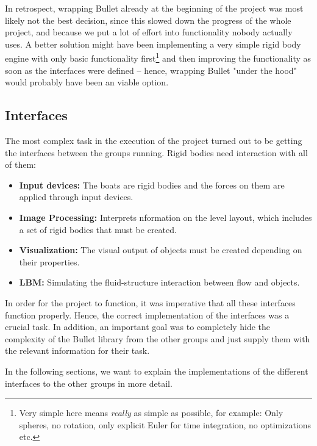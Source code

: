 In retrospect, wrapping Bullet already at the beginning of the project was most likely not the best decision, since this slowed down the progress of the whole project, and because we put a lot of effort into functionality nobody actually uses. A better solution might have been implementing a very simple rigid body engine with only basic functionality first\footnote{Very simple here means \emph{really} as simple as possible, for example: Only spheres, no rotation, only explicit Euler for time integration, no optimizations etc.} and then improving the functionality as soon as the interfaces were defined -- hence, wrapping Bullet "under the hood" would probably have been an viable option.

\subsection{Interfaces}
The most complex task in the execution of the project turned out to be getting the interfaces between the groups running. Rigid bodies need interaction with all of them:
\begin{itemize}
\item \textbf{Input devices:} The boats are rigid bodies and the forces on them are applied through input devices.
\item \textbf{Image Processing:} Interprets nformation on the level layout, which includes a set of rigid bodies that must be created.
\item \textbf{Visualization:} The visual output of objects must be created depending on their properties.
\item \textbf{LBM:} Simulating the fluid-structure interaction between flow and objects.
\end{itemize}
In order for the project to function, it was imperative that all these interfaces function properly. Hence, the correct implementation of the interfaces was a crucial task.
In addition, an important goal was to completely hide the complexity of the Bullet library from the other groups and just supply them with the relevant information for their task.

In the following sections, we want to explain the implementations of the different interfaces to the other groups in more detail.

